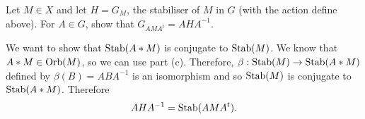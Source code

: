 \begin{parts}
\begin{subparts}
        \subpart 
        Let $M \in X$ and let $H = G_M$, the stabiliser of $M$ in $G$
        (with the action define above).
        For $A \in G$, show that $G_{AMA^t} = AHA^{-1}$.
        \begin{solution}
            We want to show that $\operatorname{Stab}(A*M)$ is conjugate to $\operatorname{Stab}(M)$.
            We know that $A*M \in \operatorname{Orb}(M)$, so we can use part (c).
            Therefore, $\beta: \operatorname{Stab}(M) \to \operatorname{Stab}(A*M)$
            defined by $\beta(B) = ABA^{-1}$
            is an isomorphism and so $\operatorname{Stab}(M)$ is conjugate to $\operatorname{Stab}(A*M)$.
            Therefore
            \[
                AHA^{-1} = \operatorname{Stab}(AMA^t).
            \]
        \end{solution}
    \end{subparts}
\end{parts}

